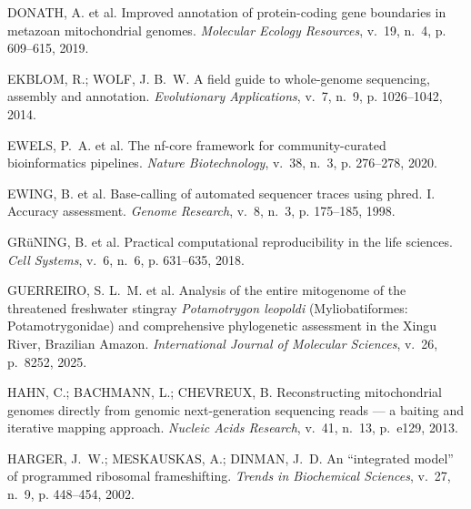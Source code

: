 \begin{thebibliography}{}
{DONATH, A. et al. Improved annotation of protein-coding gene boundaries in
  metazoan mitochondrial genomes.
\emph{Molecular Ecology Resources}, v.~19, n.~4, p. 609--615, 2019.}

{EKBLOM, R.; WOLF, J. B.~W. A field guide to whole-genome sequencing, assembly
  and annotation.
\emph{Evolutionary Applications}, v.~7, n.~9, p. 1026--1042, 2014.}

{EWELS, P.~A. et al. The nf-core framework for community-curated bioinformatics
  pipelines.
\emph{Nature Biotechnology}, v.~38, n.~3, p. 276--278, 2020.}

{EWING, B. et al. Base-calling of automated sequencer traces using phred. {I}.
  {A}ccuracy assessment.
\emph{Genome Research}, v.~8, n.~3, p. 175--185, 1998.}

{GRüNING, B. et al. Practical computational reproducibility in the life
  sciences.
\emph{Cell Systems}, v.~6, n.~6, p. 631--635, 2018.}

{GUERREIRO, S. L.~M. et al. Analysis of the entire mitogenome of the threatened
  freshwater stingray \textit{Potamotrygon leopoldi} ({M}yliobatiformes:
  {P}otamotrygonidae) and comprehensive phylogenetic assessment in the {X}ingu
  {R}iver, {B}razilian {A}mazon.
\emph{International Journal of Molecular Sciences}, v.~26, p.~8252, 2025.}

{HAHN, C.; BACHMANN, L.; CHEVREUX, B. Reconstructing mitochondrial genomes
  directly from genomic next-generation sequencing reads --- a baiting and
  iterative mapping approach.
\emph{Nucleic Acids Research}, v.~41, n.~13, p.~e129, 2013.}

{HARGER, J.~W.; MESKAUSKAS, A.; DINMAN, J.~D. An ``integrated model'' of
  programmed ribosomal frameshifting.
\emph{Trends in Biochemical Sciences}, v.~27, n.~9, p. 448--454, 2002.}


\end{thebibliography}
